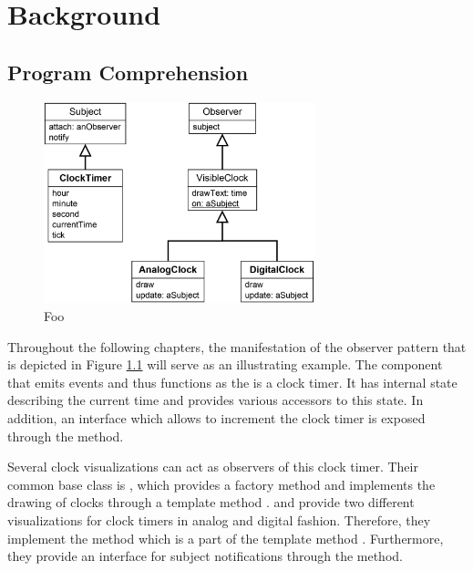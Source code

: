 \chapter{Background}
\label{c:Background}

\section{Program Comprehension}

\begin{figure}[tb]
	\centering
	\includegraphics[width=0.7\textwidth]{../images/02-ObserverExample}
	\caption[foo]{Foo}
	\label{fig:ObserverExample}
\end{figure}

Throughout the following chapters, the manifestation of the observer pattern \cite{gamma_design_1995} that is depicted in Figure \ref{fig:ObserverExample} will serve as an illustrating example.
The component that emits events and thus functions as the  is a clock timer.
It has internal state describing the current time and provides various accessors to this state.
In addition, an interface which allows to increment the clock timer is exposed through the  method.

Several clock visualizations can act as observers of this clock timer.
Their common base class is , which provides a factory method \cite{gamma_design_1995} and implements the drawing of clocks through a template method \cite{gamma_design_1995}.
 and  provide two different visualizations for clock timers in analog and digital fashion.
Therefore, they implement the  method which is a part of the template method .
Furthermore, they provide an interface for subject notifications through the  method.

